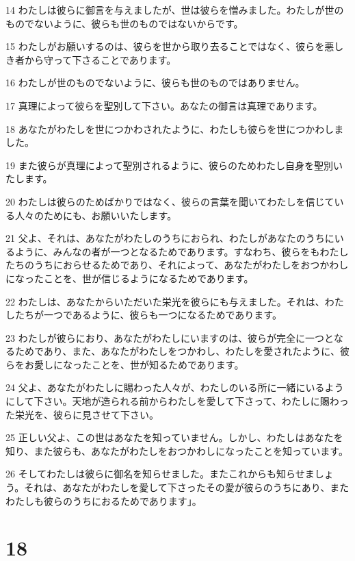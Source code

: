 \par 14 わたしは彼らに御言を与えましたが、世は彼らを憎みました。わたしが世のものでないように、彼らも世のものではないからです。
\par 15 わたしがお願いするのは、彼らを世から取り去ることではなく、彼らを悪しき者から守って下さることであります。
\par 16 わたしが世のものでないように、彼らも世のものではありません。
\par 17 真理によって彼らを聖別して下さい。あなたの御言は真理であります。
\par 18 あなたがわたしを世につかわされたように、わたしも彼らを世につかわしました。
\par 19 また彼らが真理によって聖別されるように、彼らのためわたし自身を聖別いたします。
\par 20 わたしは彼らのためばかりではなく、彼らの言葉を聞いてわたしを信じている人々のためにも、お願いいたします。
\par 21 父よ、それは、あなたがわたしのうちにおられ、わたしがあなたのうちにいるように、みんなの者が一つとなるためであります。すなわち、彼らをもわたしたちのうちにおらせるためであり、それによって、あなたがわたしをおつかわしになったことを、世が信じるようになるためであります。
\par 22 わたしは、あなたからいただいた栄光を彼らにも与えました。それは、わたしたちが一つであるように、彼らも一つになるためであります。
\par 23 わたしが彼らにおり、あなたがわたしにいますのは、彼らが完全に一つとなるためであり、また、あなたがわたしをつかわし、わたしを愛されたように、彼らをお愛しになったことを、世が知るためであります。
\par 24 父よ、あなたがわたしに賜わった人々が、わたしのいる所に一緒にいるようにして下さい。天地が造られる前からわたしを愛して下さって、わたしに賜わった栄光を、彼らに見させて下さい。
\par 25 正しい父よ、この世はあなたを知っていません。しかし、わたしはあなたを知り、また彼らも、あなたがわたしをおつかわしになったことを知っています。
\par 26 そしてわたしは彼らに御名を知らせました。またこれからも知らせましょう。それは、あなたがわたしを愛して下さったその愛が彼らのうちにあり、またわたしも彼らのうちにおるためであります」。

\chapter{18}

